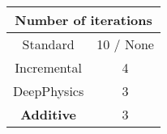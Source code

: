 \documentclass[varwidth=10.5cm,border=2mm]{standalone}
\begin{document}
    \begin{center}
        \begin{table}[htbp]
            \centering
            \begin{tabular}{cc}
                \toprule
                \multicolumn{2}{c}{\textbf{Number of iterations}} \\
                \midrule
                Standard & 10 / None \\
                \cmidrule(lr){1-2}
                Incremental & 4 \\
                \cmidrule(lr){1-2}
                DeepPhysics & 3 \\
                \cmidrule(lr){1-2}
                \textbf{Additive} & 3 \\
                \bottomrule
            \end{tabular}
        \end{table}
    \end{center}
\end{document}
